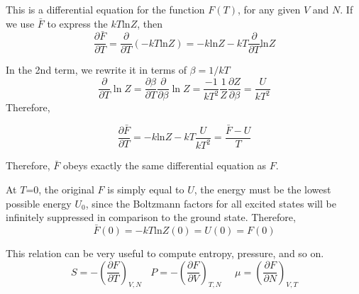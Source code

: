 This is a differential equation for the function $F(T)$, for any given $V$ and $N$. If we use $\bar{F}$ to 
express the $kT\text{ln}Z$, then
\begin{equation}
\frac{\partial{\bar{F}}}{\partial T} = \frac{\partial}{\partial T}(-kT\text{ln}Z) = -k\text{ln}Z - kT \frac{\partial}{\partial T}\text{ln}Z
\end{equation}

In the 2nd term, we rewrite it in terms of $\beta=1/kT$
\begin{equation}
\frac{\partial}{\partial T}\ln Z = \frac{\partial{\beta}}{\partial T} \frac{\partial}{\partial \beta}\ln Z 
                                      = \frac{-1}{kT^2} \frac{1}{Z} \frac{\partial Z}{\partial {\beta}} 
                                      = \frac{U}{kT^2}
\end{equation}
Therefore,

\begin{equation}
\frac{\partial{\bar{F}}}{\partial T} = -k\text{ln}Z - kT \frac{U}{kT^2} = \frac{\bar{F}-U}{T}
\end{equation}

Therefore, $\bar{F}$ obeys exactly the same differential equation as $F$.

At $T$=0, the original $F$ is simply equal to $U$, the energy must be the lowest possible energy $U_0$, since the Boltzmann
factors for all excited states will be infinitely suppressed in comparison to the ground state. Therefore,
\begin{equation}
\bar{F}(0)= -kT\text{ln}Z(0)= U(0) = F(0)
\end{equation}

This relation can be very useful to compute entropy, pressure, and so on.
\begin{equation}
S = -(\frac{\partial{F}}{\partial{T}})_{V,N} ~~~~  
P = -(\frac{\partial{F}}{\partial{V}})_{T,N} ~~~~~~ 
\mu = (\frac{\partial{F}}{\partial{N}})_{V,T}
\end{equation}


